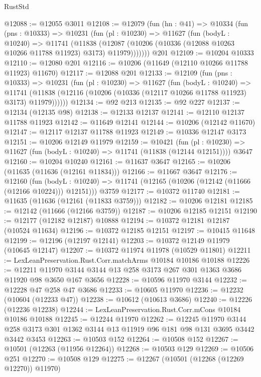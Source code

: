 \begin{lexlean}{RustStd}
\begin{coremodule}
@12088 := @12055 @3011
@12108 := @12079
    (fun (hn : @41) =>
    @10334
      (fun (pns : @10333) =>
      @10231
        (fun (pl : @10230) =>
        @11627
          (fun (bodyL : @10240) =>
          @11741
            (@11838
              (@12087 (@10206 (@10336 (@12088 @10263 @10266 @11788 @11923) @3173) @11979)))))))
    @201
@12109 := @10204 @10333
@12110 := @12080 @201
@12116 := @10206 (@11649 (@12110 @10266 @11788 @11923) @11670)
@12117 := @12088 @201
@12133 := @12109
    (fun (pns : @10333) =>
    @10231
      (fun (pl : @10230) =>
      @11627
        (fun (bodyL : @10240) =>
        @11741 (@11838 (@12116 (@10206 (@10336 (@12117 @10266 @11788 @11923) @3173) @11979))))))
@12134 := @92 @213
@12135 := @92 @227
@12137 := @12134 (@12135 @98)
@12138 := @12133 @12137
@12141 := @12110 @12137 @11788 @11923
@12142 := @11649 @12141
@12144 := @10206 (@12142 @11670)
@12147 := @12117 @12137 @11788 @11923
@12149 := @10336 @12147 @3173
@12151 := @10206 @12149 @11979
@12159 := @10421
    (fun (pl : @10230) => @11627 (fun (bodyL : @10240) => @11741 (@11838 (@12144 @12151))))
    @3647
@12160 := @10204 @10240
@12161 := @11637 @3647
@12165 := @10206 (@11635 (@11636 (@12161 @11834)))
@12166 := @11667 @3647
@12176 := @12160
    (fun (bodyL : @10240) => @11741 (@12165 (@10206 (@12142 (@11666 (@12166 @10224))) @12151)))
    @3759
@12177 := @10372 @11740
@12181 := @11635 (@11636 (@12161 (@11833 @3759)))
@12182 := @10206 @12181
@12185 := @12142 (@11666 (@12166 @3759))
@12187 := @10206 @12185 @12151
@12190 := @12177 (@12182 @12187) @10888
@12194 := @10372 @12181 @12187 (@10524 @11634)
@12196 := @10372 @12185 @12151
@12197 := @10415 @11648
@12199 := @12196 (@12197 @12141)
@12203 := @10372 @12149 @11979 (@10645 @12147)
@12207 := @10372 @11974 @11978 (@10529 @11801)
@12211 := LexLeanPreservation.Rust.Corr.matchArms @10184 @10186 @10188
@12226 := @12211 @11970 @3144 @3144 @13 @258 @3173 @267 @301 @1363 @3686 @11920 @98 @3650 @167 @3656
@12228 := @10596 @11970 @3144
@12232 := @12228 @47 @258 @47 @3686
@12233 := @10605 @11970
@12236 := @12232 (@10604 (@12233 @47))
@12238 := @10612 (@10613 @3686)
@12240 := @12226 (@12236 @12238)
@12244 := LexLeanPreservation.Rust.Corr.mCons @10184 @10186 @10188
@12245 := @12244 @11970
@12262 := @12245
    @11970
    @3144
    @258
    @3173
    @301
    @1362
    @3144
    @13
    @11919
    @96
    @181
    @98
    @131
    @3695
    @3442
    @3442
    @3453
@12263 := @10503 @152
@12264 := @10508 @152
@12267 := @10501 (@12263 (@11956 @12264))
@12268 := @10503 @129
@12269 := @10506 @251
@12270 := @10508 @129
@12275 := @12267 (@10501 (@12268 (@12269 @12270)) @11970)

\end{coremodule}
\end{lexlean}
